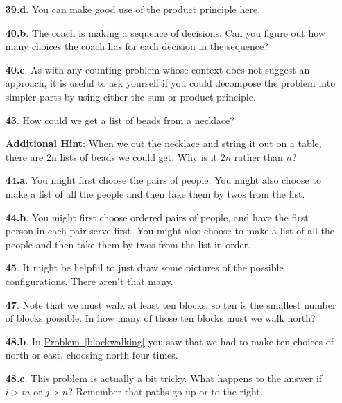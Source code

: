 \documentclass[10pt,]{book}
\theoremstyle{plain}
\theoremstyle{definition}
\theoremstyle{definition}
\numberwithin{equation}{chapter}
\newcommand{\gt}{>}
\begin{document}
\begin{itemize}[itemsep=1em]
\item[\textbf{39.d}.]You can make good use of the product principle here.%

\item[\textbf{40.b}.]The coach is making a sequence of decisions. Can you figure out how many choices the coach has for each decision in the sequence?%

\item[\textbf{40.c}.]As with any counting problem whose context does not suggest an approach, it is useful to ask yourself if you could decompose the problem into simpler parts by using either the sum or product principle.%

\item[\textbf{43}.]How could we get a list of beads from a necklace?%

\par\smallskip
\noindent\textbf{Additional Hint}: When we cut the necklace and string it out on a table, there are 2n lists of beads we could get. Why is it \(2n\) rather than \(n\)?%

\item[\textbf{44.a}.]You might first choose the pairs of people. You might also choose to make a list of all the people and then take them by twos from the list.%

\item[\textbf{44.b}.]You might first choose ordered pairs of people, and have the first person in each pair serve first. You might also choose to make a list of all the people and then take them by twos from the list in order.%

\item[\textbf{45}.]It might be helpful to just draw some pictures of the possible configurations. There aren't that many.%

\item[\textbf{47}.]Note that we must walk at least ten blocks, so ten is the smallest number of blocks possible. In how many of those ten blocks must we walk north?%

\item[\textbf{48.b}.]In \hyperref[blockwalking]{Problem~\ref{blockwalking}} you saw that we had to make ten choices of north or east, choosing north four times.%

\item[\textbf{48.c}.]This problem is actually a bit tricky. What happens to the answer if \(i \gt m\) or \(j \gt n\)? Remember that paths go up or to the right.%


\end{itemize}
\end{document}
